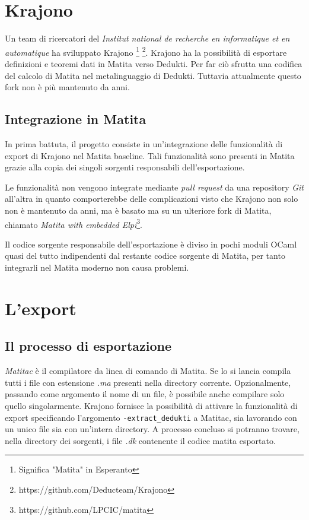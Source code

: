 \documentclass[12pt,a4paper]{report}
\begin{document}
\section{Krajono}
Un team di ricercatori del \textit{Institut national de recherche en informatique 
et en automatique} ha sviluppato Krajono \footnote{Significa "Matita" in Esperanto}
\footnote{https://github.com/Deducteam/Krajono}. Krajono ha la possibilità
di esportare definizioni e teoremi dati in Matita verso Dedukti. Per far ciò
sfrutta una codifica del calcolo di Matita nel metalinguaggio di Dedukti. 
Tuttavia attualmente questo fork non è più mantenuto da anni.

\subsection{Integrazione in Matita}
In prima battuta, il progetto consiste in un'integrazione delle funzionalità di export di
Krajono nel Matita baseline. Tali funzionalità sono presenti in Matita grazie alla 
copia dei singoli sorgenti responsabili dell'esportazione. 

Le funzionalità non vengono integrate mediante \textit{pull request} da una
repository \textit{Git} all'altra in quanto comporterebbe delle complicazioni
visto che Krajono non solo non è mantenuto da anni, ma è basato ma su un ulteriore
fork di Matita, chiamato \textit{Matita with embedded Elpi}\footnote{https://github.com/LPCIC/matita}. 

Il codice sorgente responsabile dell'esportazione è diviso in pochi moduli OCaml
quasi del tutto indipendenti dal restante codice sorgente di Matita, per tanto
integrarli nel Matita moderno non causa problemi.

\section{L'export}
\subsection{Il processo di esportazione}
\textit{Matitac} è il compilatore da linea di comando di Matita. Se lo si lancia
compila tutti i file con estensione \textit{.ma} presenti nella directory corrente. 
Opzionalmente, passando come argomento il nome di un file, è possibile anche 
compilare solo quello singolarmente. Krajono fornisce la possibilità di attivare
la funzionalità di export specificando l'argomento \texttt{-extract\_dedukti} a Matitac,
sia lavorando con un unico file sia con un'intera directory. A processo concluso 
si potranno trovare, nella directory dei sorgenti, i file \textit{.dk} contenente
il codice matita esportato.
\end{document}
